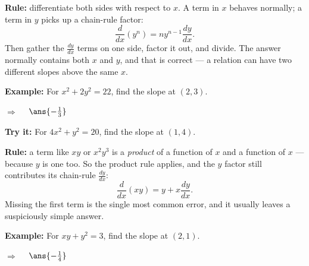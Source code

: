 \documentclass[12pt]{article}
\begin{document}


\begin{formulabox}
\textbf{Rule:} differentiate both sides with respect to $x$. A term in $x$
behaves normally; a term in $y$ picks up a chain-rule factor:
\[
  \frac{d}{dx}\left(y^n\right) = ny^{n-1}\frac{dy}{dx}.
\]
Then gather the $\frac{dy}{dx}$ terms on one side, factor it out, and divide.
The answer normally contains both $x$ and $y$, and that is correct --- a relation
can have two different slopes above the same $x$.
\end{formulabox}

\begin{examplebox}
\textbf{Example:} \quad For $x^2 + 2y^2 = 22$, find the slope at $(2,3)$.

$\Rightarrow\quad$ $\ans{-\tfrac{1}{3}}$
\end{examplebox}

\begin{tryitbox}
\textbf{Try it:} \quad For $4x^2 + y^2 = 20$, find the slope at $(1,4)$.\\[2pt]
\end{tryitbox}


\begin{formulabox}
\textbf{Rule:} a term like $xy$ or $x^2y^3$ is a \emph{product} of a function of
$x$ and a function of $x$ --- because $y$ is one too. So the product rule
applies, and the $y$ factor still contributes its chain-rule
$\frac{dy}{dx}$:
\[
  \frac{d}{dx}(xy) = y + x\frac{dy}{dx}.
\]
Missing the first term is the single most common error, and it usually leaves a
suspiciously simple answer.
\end{formulabox}

\begin{examplebox}
\textbf{Example:} \quad For $xy + y^2 = 3$, find the slope at $(2,1)$.

$\Rightarrow\quad$ $\ans{-\tfrac{1}{4}}$
\end{examplebox}
\end{document}
